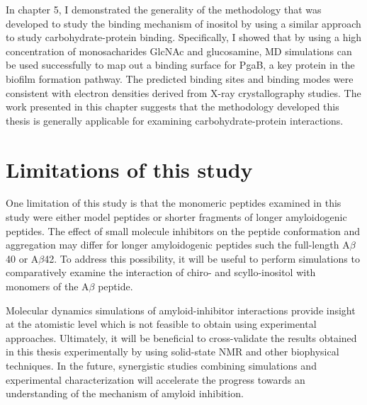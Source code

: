 In chapter 5, I demonstrated the generality of the methodology that was developed to study the binding mechanism of inositol by using a similar approach to study carbohydrate-protein binding. Specifically, I showed that by using a high concentration of monosacharides GlcNAc and glucosamine, MD simulations can be used successfully to map out a binding surface for PgaB, a key protein in the biofilm formation pathway. The predicted binding sites and binding modes were consistent with electron densities derived from X-ray crystallography studies.  The work presented in this chapter suggests that the methodology developed this thesis is generally applicable for examining carbohydrate-protein interactions.

\section{Limitations of this study}

One limitation of this study is that the monomeric peptides examined in this study were either model peptides or shorter fragments of longer amyloidogenic peptides. The effect of small molecule inhibitors on the peptide conformation and aggregation may differ for longer amyloidogenic peptides such the full-length A$\beta$40 or A$\beta$42. To address this possibility, it will be useful to perform simulations to comparatively examine the interaction of chiro- and scyllo-inositol with monomers of the A$\beta$ peptide.

Molecular dynamics simulations of amyloid-inhibitor interactions provide insight at the atomistic level which is not feasible to obtain using experimental approaches.  Ultimately, it will be beneficial to cross-validate the results obtained in this thesis experimentally by using solid-state NMR and other biophysical techniques. In the future, synergistic studies combining simulations and experimental characterization will accelerate the progress towards an understanding of the mechanism of amyloid inhibition.   

